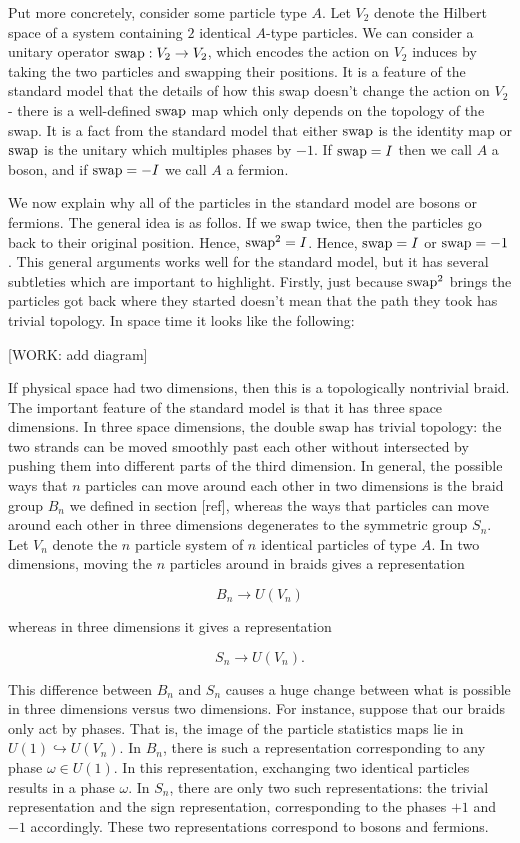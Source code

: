 \documentclass{article}
\theoremstyle{definition}
\numberwithin{figure}{section}
\begin{document}
Put more concretely, consider some particle type $A$. Let $V_2$ denote the Hilbert space of a system containing $2$ identical $A$-type particles. We can consider a unitary operator $\mathrm{swap}:V_2\to V_2$, which encodes the action on $V_2$ induces by taking the two particles and swapping their positions. It is a feature of the standard model that the details of how this swap doesn't change the action on $V_2$ - there is a well-defined $\mathrm{swap}$ map which only depends on the topology of the swap. It is a fact from the standard model that either $\mathrm{swap}$ is the identity map or $\mathrm{swap}$ is the unitary which multiples phases by $-1$. If $\mathrm{swap}=I$ then we call $A$ a boson, and if $\mathrm{swap}=-I$ we call $A$ a fermion.

We now explain why all of the particles in the standard model are bosons or fermions. The general idea is as follos. If we swap twice, then the particles go back to their original position. Hence, $\mathrm{swap}^2=I$. Hence, $\mathrm{swap}=I$ or $\mathrm{swap}=-1$. This general arguments works well for the standard model, but it has several subtleties which are important to highlight. Firstly, just because $\mathrm{swap}^2$ brings the particles got back where they started doesn't mean that the path they took has trivial topology. In space time it looks like the following:

[WORK: add diagram]

If physical space had two dimensions, then this is a topologically nontrivial braid. The important feature of the standard model is that it has three space dimensions. In three space dimensions, the double swap has trivial topology: the two strands can be moved smoothly past each other without intersected by pushing them into different parts of the third dimension. In general, the possible ways that $n$ particles can move around each other in two dimensions is the braid group $B_n$ we defined in section [ref], whereas the ways that particles can move around each other in three dimensions degenerates to the symmetric group $S_n$. Let $V_n$ denote the $n$ particle system of $n$ identical particles of type $A$. In two dimensions, moving the $n$ particles around in braids gives a representation

$$B_n\xrightarrow{}U(V_n)$$

whereas in three dimensions it gives a representation

$$S_n\xrightarrow{}U(V_n).$$

This difference between $B_n$ and $S_n$ causes a huge change between what is possible in three dimensions versus two dimensions. For instance, suppose that our braids only act by phases. That is, the image of the particle statistics maps lie in $U(1)\hookrightarrow{}U(V_n)$. In $B_n$, there is such a representation corresponding to any phase $\omega\in U(1)$. In this representation, exchanging two identical particles results in a phase $\omega$. In $S_n$, there are only two such representations: the trivial representation and the sign representation, corresponding to the phases $+1$ and $-1$ accordingly. These two representations correspond to bosons and fermions.
\end{document}
